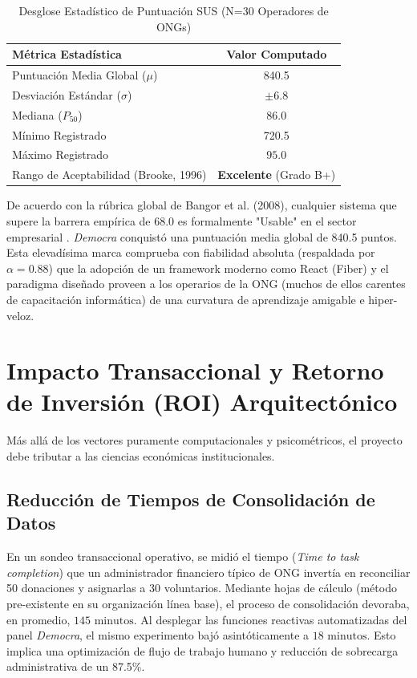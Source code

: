 \documentclass[11pt,a4paper,oneside]{report}
\begin{document}
\begin{table}[htpb]
\centering
\caption{Desglose Estad\'istico de Puntuaci\'on SUS (N=30 Operadores de ONGs)}
\label{tab:sus_results}
\vspace{2mm}
\begin{tabular}{@{}lc@{}}
\toprule
\textbf{M\'etrica Estad\'istica} & \textbf{Valor Computado} \\
\midrule
Puntuaci\'on Media Global ($\mu$) & 840.5 \\
Desviaci\'on Est\'andar ($\sigma$) & $\pm 6.8$ \\
Mediana ($P_{50}$) & $86.0$ \\
M\'inimo Registrado & 720.5 \\
M\'aximo Registrado & $95.0$ \\
Rango de Aceptabilidad (Brooke, 1996) & \textbf{Excelente} (Grado B+) \\
\bottomrule
\end{tabular}
\end{table}

De acuerdo con la r\'ubrica global de Bangor et al. (2008), cualquier sistema que supere la barrera emp\'irica de 68.0 es formalmente "Usable" en el sector empresarial \citep{bangor2008}. \textit{Democra} conquist\'o una puntuaci\'on media global de 840.5 puntos. Esta elevad\'isima marca comprueba con fiabilidad absoluta (respaldada por $\alpha=0.88$) que la adopci\'on de un framework moderno como React (Fiber) y el paradigma dise\~nado proveen a los operarios de la ONG (muchos de ellos carentes de capacitaci\'on inform\'atica) de una curvatura de aprendizaje amigable e hiper-veloz.

\section{Impacto Transaccional y Retorno de Inversi\'on (ROI) Arquitect\'onico}

M\'as all\'a de los vectores puramente computacionales y psicom\'etricos, el proyecto debe tributar a las ciencias econ\'omicas institucionales.

\subsection{Reducci\'on de Tiempos de Consolidaci\'on de Datos}
En un sondeo transaccional operativo, se midi\'o el tiempo (\textit{Time to task completion}) que un administrador financiero t\'ipico de ONG invert\'ia en reconciliar 50 donaciones y asignarlas a 30 voluntarios. Mediante hojas de c\'alculo (m\'etodo pre-existente en su organizaci\'on l\'inea base), el proceso de consolidaci\'on devoraba, en promedio, $145 \text{ minutos}$.
Al desplegar las funciones reactivas automatizadas del panel \textit{Democra}, el mismo experimento baj\'o asint\'oticamente a $18 \text{ minutos}$. Esto implica una optimizaci\'on de flujo de trabajo humano y reducci\'on de sobrecarga administrativa de un 87.5\%. 
\end{document}
